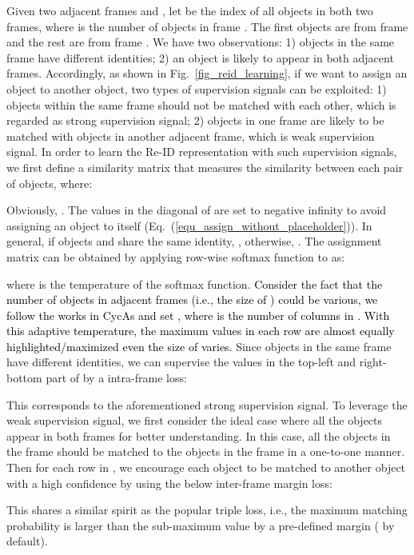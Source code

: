 \documentclass[final,1p,times,twocolumn]{elsarticle}
\newcommand{\eref}[1]{Eq.~(\ref{#1})}
\newcommand{\fref}[1]{Fig.~\ref{#1}}
\newcommand{\qiankun}[1]{\textcolor{black}{#1}}
\begin{document}
	
	
	
	Given two adjacent frames  and , let  be the index of all objects in both two frames, where  is the number of objects in frame . The first  objects are from frame  and the rest are from frame . We have two observations: 1) objects in the same frame have different identities; 2) an object is likely to appear in both adjacent frames. Accordingly, as shown in \fref{fig_reid_learning}, if we want to assign an object to another object, two types of supervision signals can be exploited: 1) objects within the same frame should not be matched with each other, which is regarded as strong supervision signal; 2) objects in one frame are likely to be matched with objects in another adjacent frame, which is weak supervision signal. In order to learn the Re-ID representation with such supervision signals, we first define a similarity matrix  that measures the similarity between each pair of objects, where:
	
	Obviously, . The values in the diagonal of  are set to negative infinity to avoid assigning an object to itself (\eref{equ_assign_without_placeholder}). In general, if objects  and  share the same identity, , otherwise, . The assignment matrix  can be obtained by applying row-wise softmax function to  as:
	
	where  is the temperature of the softmax function.
	\qiankun{
	Consider the fact that the number of objects in adjacent frames (i.e., the size of ) could be various,  we follow the works in CycAs \cite{wang2020cycas} and set , where  is the number of columns in . With this adaptive temperature, the maximum values in each row are almost equally highlighted/maximized even the size of  varies.}	Since objects in the same frame have different identities, we can supervise the values in the top-left and right-bottom part of  by a intra-frame loss:
	
	This corresponds to the aforementioned strong supervision signal.
	To leverage the weak supervision signal, we first consider the ideal case where all the objects appear in both frames for better understanding. In this case, all the objects in the frame  should be matched to the objects in the frame  in a one-to-one manner. Then for each row in , we encourage each object to be matched to another object with a high confidence by using the below inter-frame margin loss:
	
	This shares a similar spirit as the popular triple loss, i.e., the maximum matching probability  is larger than the sub-maximum value by a pre-defined margin  ( by default).
	
\end{document}
